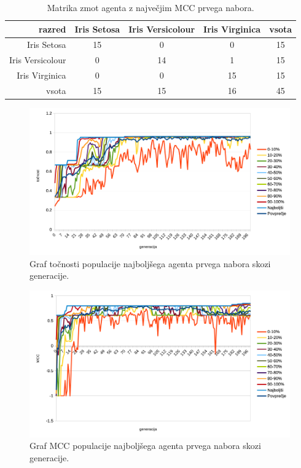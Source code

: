 \begin{table}[H]
    \centering
    \begin{tabular}{||rcccc||}
        \hline
        razred           & Iris Setosa & Iris Versicolour & Iris Virginica & vsota \\ \hline
        Iris Setosa      & 15          & 0                & 0              & 15    \\ \hline
        Iris Versicolour & 0           & 14               & 1              & 15    \\ \hline
        Iris Virginica   & 0           & 0                & 15             & 15    \\ \hline
        vsota            & 15          & 15               & 16             & 45    \\ \hline
    \end{tabular}
    \caption{Matrika zmot agenta z največjim MCC prvega nabora.}
    \label{tab:iris_mcc_1}
\end{table}

\begin{figure}[H]
    \begin{center}
        \includegraphics[width=13cm]{iris/1/acc}
    \end{center}
    \caption{Graf točnosti populacije najboljšega agenta prvega nabora skozi generacije.}
    \label{fig:iris_acc_1}
\end{figure}

\begin{figure}[H]
    \begin{center}
        \includegraphics[width=13cm]{iris/1/mcc}
    \end{center}
    \caption{Graf MCC populacije najboljšega agenta prvega nabora skozi generacije.}
    \label{fig:iris_mcc_1}
\end{figure}

